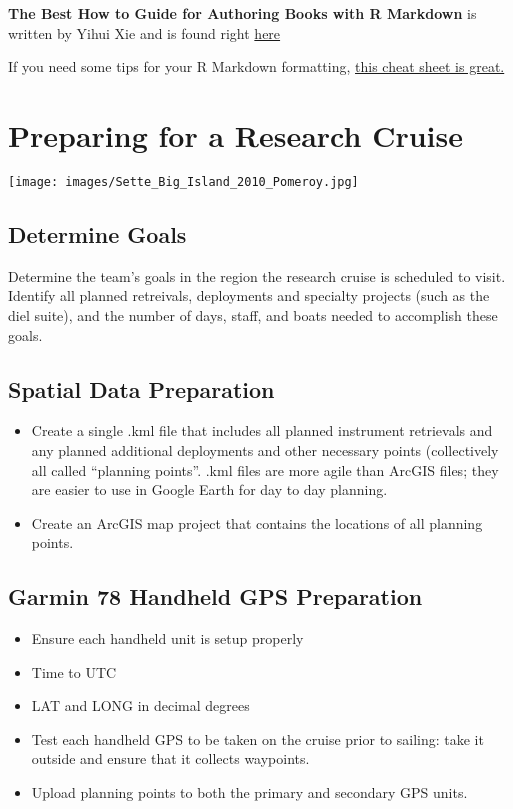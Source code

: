 \documentclass[]{book}
\providecommand{\tightlist}{%
  \setlength{\itemsep}{0pt}\setlength{\parskip}{0pt}}
\begin{document}
\textbf{The Best How to Guide for Authoring Books with R Markdown} is
written by Yihui Xie and is found right
\href{https://bookdown.org/yihui/bookdown/}{here}

If you need some tips for your R Markdown formatting,
\href{https://rmarkdown.rstudio.com/lesson-15.html}{this cheat sheet is
great.}

\chapter{Preparing for a Research Cruise}\label{cruise_prep}

\texttt{[image: images/Sette\_Big\_Island\_2010\_Pomeroy.jpg]}

\section{Determine Goals}\label{determine-goals}

Determine the team's goals in the region the research cruise is
scheduled to visit. Identify all planned retreivals, deployments and
specialty projects (such as the diel suite), and the number of days,
staff, and boats needed to accomplish these goals.

\section{Spatial Data Preparation}\label{spatial-data-preparation}

\begin{itemize}
\tightlist
\item
  Create a single .kml file that includes all planned instrument
  retrievals and any planned additional deployments and other necessary
  points (collectively all called ``planning points''. .kml files are
  more agile than ArcGIS files; they are easier to use in Google Earth
  for day to day planning.
\item
  Create an ArcGIS map project that contains the locations of all
  planning points.
\end{itemize}

\section{Garmin 78 Handheld GPS
Preparation}\label{garmin-78-handheld-gps-preparation}

\begin{itemize}
\tightlist
\item
  Ensure each handheld unit is setup properly
\item
  Time to UTC
\item
  LAT and LONG in decimal degrees
\item
  Test each handheld GPS to be taken on the cruise prior to sailing:
  take it outside and ensure that it collects waypoints.
\item
  Upload planning points to both the primary and secondary GPS units.
\end{itemize}
\end{document}
